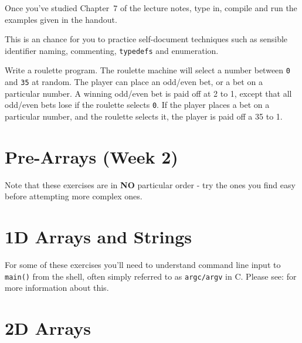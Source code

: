 \begin{exercise}
Once you've studied Chapter~$7$ of the lecture notes, type in,
compile and run the examples given in the handout.
\end{exercise}

This is an chance for you to practice self-document techniques such as
sensible identifier naming, commenting, \verb^typedefs^ and enumeration. 
\begin{exercise}
Write a roulette program. The roulette machine will select
a number between \verb^0^ and \verb^35^ at random. The player
can place an odd/even bet, or a bet on a particular number.
A winning odd/even bet is paid off at 2 to 1, except
that all odd/even bets lose if the roulette selects \verb^0^.
If the player places a bet on a particular number, and the
roulette selects it, the player is paid off a 35 to 1.
\end{exercise}




\chapter{Pre-Arrays (Week 2)}

Note that these exercises are  in {\bf NO} particular order - try the ones you find easy before attempting more complex ones.












\chapter{1D Arrays and Strings}

For some of these exercises you'll need to understand command line input to
\verb^main()^ from the shell, often simply referred to as \verb^argc/argv^ in C.
Please see:
for more information about this.











\chapter{2D Arrays}

